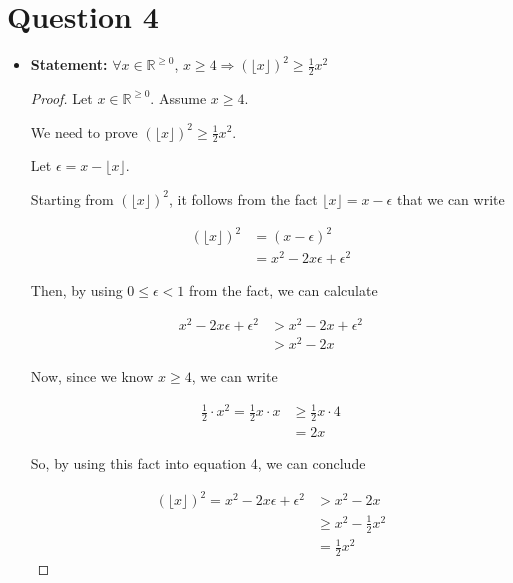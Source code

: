 \documentclass[12pt]{article}
\begin{document}
\section*{Question 4}
\begin{itemize}
    \item

    \textbf{Statement:} $\forall x \in \mathbb{R}^{\geq 0}$, $x \geq 4 \Rightarrow
    (\lfloor x \rfloor)^2 \geq \frac{1}{2}x^2$

    \bigskip

    \begin{proof}
    Let $x \in \mathbb{R}^{\geq 0}$. Assume $x \geq 4$.

    \bigskip

    We need to prove $(\lfloor x \rfloor)^2 \geq \frac{1}{2}x^2$.

    \bigskip

    Let $\epsilon = x - \lfloor x \rfloor$.

    \bigskip

    Starting from $(\lfloor x \rfloor)^2$, it follows from the fact
    $\lfloor x \rfloor = x - \epsilon$ that we can write

    \setcounter{equation}{0}
    \begin{align}
        (\lfloor x \rfloor)^2 &= (x - \epsilon)^2\\
        &= x^2 - 2x\epsilon + \epsilon^2
    \end{align}

    \bigskip

    Then, by using $0 \leq \epsilon < 1$ from the fact, we can calculate

    \begin{align}
        x^2 -2x\epsilon + \epsilon^2 &> x^2 - 2x + \epsilon^2\\
        &> x^2 - 2x
    \end{align}

    \bigskip

    Now, since we know $x \geq 4$, we can write

    \begin{align}
        \frac{1}{2} \cdot x^2 = \frac{1}{2} x \cdot x &\geq \frac{1}{2}x \cdot 4\\
        &= 2x
    \end{align}

    \bigskip

    So, by using this fact into equation 4, we can conclude

    \begin{align}
        (\lfloor x \rfloor)^2 = x^2 - 2x\epsilon + \epsilon^2 &> x^2 - 2x\\
        &\geq x^2 - \frac{1}{2}x^2\\
        &= \frac{1}{2}x^2
    \end{align}

    \end{proof}

\end{itemize}
\end{document}
